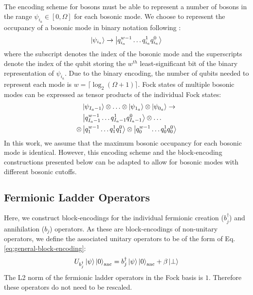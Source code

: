 The encoding scheme for bosons must be able to represent a number of bosons in the range $\psi_{i_a} \in [0, \Omega]$ for each bosonic mode.
We choose to represent the occupancy of a bosonic mode in binary notation following \cite{rhodes2024exponential}:
\begin{equation}
    \ket{\psi_{i_a}} \rightarrow \ket{q_{i_a}^{w-1} \hdots q_{i_a}^{1} q_{i_a}^0}
\end{equation}
where the subscript denotes the index of the bosonic mode and the superscripts denote the index of the qubit storing the $w^{th}$ least-significant bit of the binary representation of $\psi_{i_a}$.
Due to the binary encoding, the number of qubits needed to represent each mode is $w = \lceil \log_2{(\Omega + 1)} \rceil$.
Fock states of multiple bosonic modes can be expressed as tensor products of the individual Fock states:
\begin{equation}
    \begin{split}
        &\ket{\psi_{I_a - 1}} \otimes \hdots \otimes \ket{\psi_{1_a}} \otimes \ket{\psi_{0_a}} \rightarrow \\
        &\ket{q_{I_a - 1}^{w-1} \hdots q_{I_a - 1}^{1} q_{I_a - 1}^0} \otimes \hdots \\
        \otimes &\ket{q_{1}^{w-1} \hdots q_{1}^{1} q_{1}^0} \otimes \ket{q_{0}^{w-1} \hdots q_{0}^{1} q_{0}^0} \\
    \end{split}
\end{equation}
In this work, we assume that the maximum bosonic occupancy for each bosonic mode is identical.
However, this encoding scheme and the block-encoding constructions presented below can be adapted to allow for bosonic modes with different bosonic cutoffs.

\subsection{Fermionic Ladder Operators}
\label{subsec:fermionic-be}

Here, we construct block-encodings for the individual fermionic creation ($b_j^\dagger$) and annihilation ($b_j$) operators.
As these are block-encodings of non-unitary operators, we define the associated unitary operators to be of the form of Eq. \ref{eq:general-block-encoding}:
\begin{equation}
    U_{b^\dagger_j} \ket{\psi} \ket{0}_\text{anc} = b^\dagger_j \ket{\psi}\ket{0}_\text{anc} + \beta \ket{\perp}
\end{equation}
The L2 norm of the fermionic ladder operators in the Fock basis is $1$. 
Therefore these operators do not need to be rescaled.

